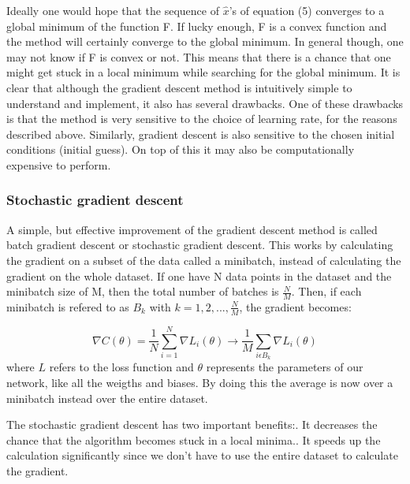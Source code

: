 \documentclass[a4paper,12pt]{article}
\begin{document}
Ideally one would hope that the sequence of $\hat{x}$'s of equation (5) converges to a global minimum of the function F. If lucky enough, F is a convex function and the method will certainly converge to the global minimum.\newline 
In general though, one may not know if F is convex or not. This means that there is a chance that one might get stuck in a local minimum while searching for the global minimum. It is clear that although the gradient descent method is intuitively simple to understand and implement, it also has several drawbacks.\newline
One of these drawbacks is that the method is very sensitive to the choice of learning rate, for the reasons described above. Similarly, gradient descent is also sensitive to the chosen initial conditions (initial guess). On top of this it may also be computationally expensive to perform.

\subsubsection{Stochastic gradient descent}
A simple, but effective improvement of the gradient descent method is called batch gradient descent or stochastic gradient descent. This works by calculating the gradient on a subset of the data called a minibatch, instead of calculating the gradient on the whole dataset. If one have N data points in the dataset and the minibatch size of M, then the total number of batches is $\frac{N}{M}$. Then, if each minibatch is refered to as $B_k$ with $k = 1, 2,..., \frac{N}{M}$, the gradient becomes:

\begin{equation}
    \nabla C(\theta) = \frac{1}{N} \sum_{i=1}^N{\nabla L_i (\theta)} \rightarrow \frac{1}{M} \sum_{i \epsilon B_k} \nabla L_i(\theta)
\end{equation}
where $L$ refers to the loss function and $\theta$ represents the parameters of our network, like all the weigths and biases. By doing this the average is now over a minibatch instead over the entire dataset.\newline

The stochastic gradient descent has two important benefits:. It decreases the chance that the algorithm becomes stuck in a local minima.. It speeds up the calculation significantly since we don't have to use the entire dataset to calculate the gradient.\newline
\end{document}
